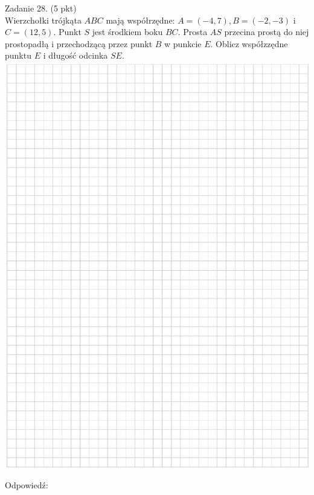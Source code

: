 \documentclass[10pt]{article}
\begin{document}
Zadanie 28. (5 pkt)\\
Wierzchołki trójkąta \(A B C\) mają współrzędne: \(A=(-4,7), B=(-2,-3)\) i \(C=(12,5)\). Punkt \(S\) jest środkiem boku \(B C\). Prosta \(A S\) przecina prostą do niej prostopadłą i przechodzącą przez punkt \(B\) w punkcie \(E\). Oblicz współzzędne punktu \(E\) i długość odcinka \(S E\).\\
\includegraphics[max width=\textwidth, center]{2024_11_21_6438f6dbc3784fe6d1deg-12}

Odpowiedź: \(\qquad\)
\end{document}
